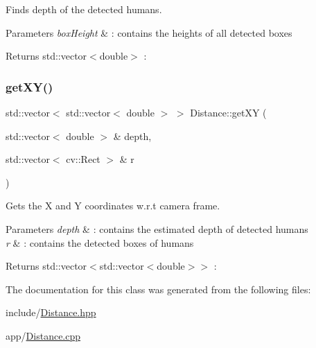 Finds depth of the detected humans. 


\begin{DoxyParams}{Parameters}
{\em box\+Height} & \+: contains the heights of all detected boxes \\
\hline
\end{DoxyParams}
\begin{DoxyReturn}{Returns}
std\+::vector$<$double$>$ \+: 
\end{DoxyReturn}
\mbox{\label{classDistance_a55adbc3ca34cb0c56237c84259305f5e}} 
\subsubsection{\texorpdfstring{get\+X\+Y()}{getXY()}}
{\footnotesize\ttfamily std\+::vector$<$ std\+::vector$<$ double $>$ $>$ Distance\+::get\+XY (\begin{DoxyParamCaption}\item[{std\+::vector$<$ double $>$ \&}]{depth,  }\item[{std\+::vector$<$ cv\+::\+Rect $>$ \&}]{r }\end{DoxyParamCaption})}



Gets the X and Y coordinates w.\+r.\+t camera frame. 


\begin{DoxyParams}{Parameters}
{\em depth} & \+: contains the estimated depth of detected humans \\
\hline
{\em r} & \+: contains the detected boxes of humans \\
\hline
\end{DoxyParams}
\begin{DoxyReturn}{Returns}
std\+::vector$<$std\+::vector$<$double$>$$>$ \+: 
\end{DoxyReturn}


The documentation for this class was generated from the following files\+:\begin{DoxyCompactItemize}
\item 
include/\hyperlink{Distance_8hpp}{Distance.\+hpp}\item 
app/\hyperlink{Distance_8cpp}{Distance.\+cpp}\end{DoxyCompactItemize}
